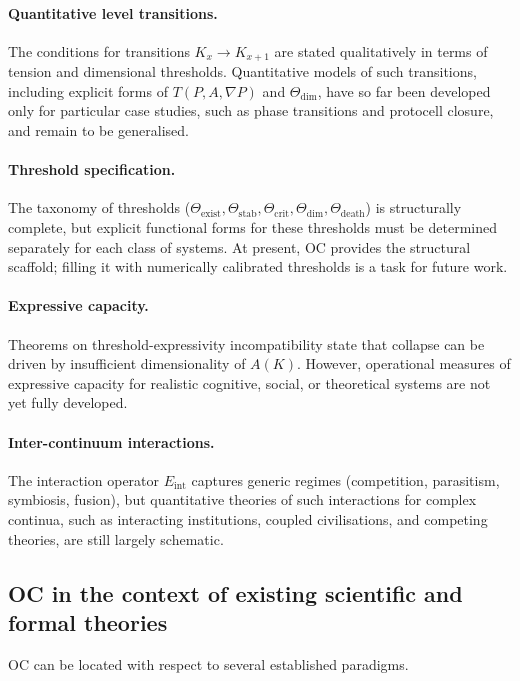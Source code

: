 \paragraph{Quantitative level transitions.}
The conditions for transitions \(K_x \to K_{x+1}\) are stated qualitatively in terms of tension and dimensional thresholds.
Quantitative models of such transitions, including explicit forms of \(T(P,A,\nabla P)\) and \(\Theta_{\mathrm{dim}}\), have so far been developed only for particular case studies, such as phase transitions and protocell closure, and remain to be generalised.

\paragraph{Threshold specification.}
The taxonomy of thresholds (\(\Theta_{\mathrm{exist}}, \Theta_{\mathrm{stab}}, \Theta_{\mathrm{crit}}, \Theta_{\mathrm{dim}}, \Theta_{\mathrm{death}}\)) is structurally complete, 
but explicit functional forms for these thresholds must be determined separately for each class of systems.
At present, OC provides the structural scaffold; filling it with numerically calibrated thresholds is a task for future work.

\paragraph{Expressive capacity.}
Theorems on threshold-expressivity incompatibility state that collapse can be driven by insufficient dimensionality of \(A(K)\).
However, operational measures of expressive capacity for realistic cognitive,
social, or theoretical systems are not yet fully developed.

\paragraph{Inter-continuum interactions.}
The interaction operator \(E_{\mathrm{int}}\) captures generic regimes (competition, parasitism, symbiosis, fusion), but quantitative theories of such interactions for complex continua, such as interacting institutions, coupled civilisations, and competing theories, are still largely schematic.

\subsection{OC in the context of existing scientific and formal theories}

OC can be located with respect to several established paradigms.

